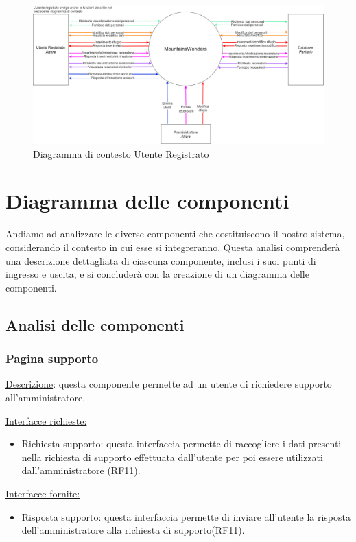 \documentclass[a4paper,12pt]{article}
\begin{document}
\begin{figure}[H]
   \centering   \includegraphics[width=1.0\textwidth]{img/contesto_registrato.png}
    \caption{Diagramma di contesto Utente Registrato}
\end{figure}
\newpage
\section{Diagramma delle componenti}
Andiamo ad analizzare le diverse componenti che costituiscono il nostro sistema, considerando il contesto in cui esse si integreranno. Questa analisi comprenderà una descrizione dettagliata di ciascuna componente, inclusi i suoi punti di ingresso e uscita, e si concluderà con la creazione di un diagramma delle componenti.


\subsection{Analisi delle componenti}

\subsubsection{Pagina supporto}
\underline{Descrizione}: questa componente permette ad un utente di richiedere supporto all'amministratore.

\underline{Interfacce richieste:}
\begin{itemize}
\item Richiesta supporto: questa interfaccia permette di raccogliere i dati presenti nella richiesta di supporto effettuata dall'utente per poi essere utilizzati dall'amministratore (RF11).
\end{itemize}

\underline{Interfacce fornite:}
\begin{itemize}
\item Risposta supporto: questa interfaccia permette di inviare all'utente la risposta dell'amministratore alla richiesta di supporto(RF11).
\end{itemize}
\end{document}
